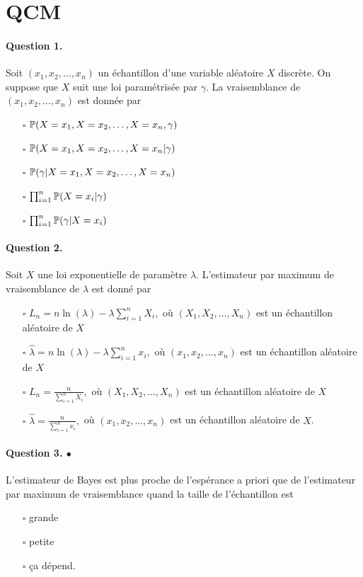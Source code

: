
\section{QCM}
\paragraph{Question 1.} Soit $(x_1, x_2, \dots, x_n)$ un échantillon d'une
variable aléatoire $X$ discrète. On suppose que $X$ suit une loi paramétrisée
par $\gamma$. La vraisemblance de $(x_1, x_2, \dots, x_n)$ est donnée par
\begin{itemize}
\item[$\square$] $\mathbb{P}(X=x_1, X=x_2, \dots, X=x_n, \gamma)$
\item[$\square$] $\mathbb{P}(X=x_1, X=x_2, \dots, X=x_n | \gamma)$
\item[$\square$] $\mathbb{P}(\gamma | X=x_1, X=x_2, \dots, X=x_n)$
\item[$\square$] $\prod_{i=1}^n \mathbb{P}(X=x_i|\gamma)$
\item[$\square$] $\prod_{i=1}^n \mathbb{P}(\gamma|X=x_i)$
\end{itemize}

\paragraph{Question 2.} Soit $X$ une loi exponentielle de paramètre
$\lambda$. L'estimateur par maximum de vraisemblance de $\lambda$ est donné par
\begin{itemize}
\item[$\square$] $L_n = n \ln(\lambda) - \lambda \sum_{i=1}^n X_i,$ où $(X_1, X_2, \dots, X_n)$ est un échantillon aléatoire de $X$
\item[$\square$] $\widehat{\lambda} = n \ln(\lambda) - \lambda \sum_{i=1}^n x_i,$ où $(x_1, x_2, \dots, x_n)$ est un échantillon aléatoire de $X$
\item[$\square$] $L_n = \frac{n}{\sum_{i=1}^n X_i},$ où $(X_1, X_2, \dots, X_n)$ est un échantillon aléatoire de $X$
\item[$\square$] $\widehat{\lambda} = \frac{n}{\sum_{i=1}^n x_i},$ où $(x_1, x_2, \dots, x_n)$ est un échantillon aléatoire de $X$.
\end{itemize}

\paragraph{Question 3. $\bullet$} L'estimateur de Bayes est plus proche de l'espérance a
priori que de l'estimateur par maximum de vraisemblance quand la taille de
l'échantillon est
\begin{itemize}
\item[$\square$] grande
\item[$\square$] petite
\item[$\square$] ça dépend.
\end{itemize}



